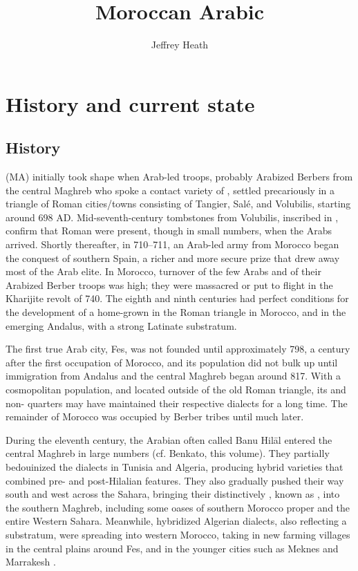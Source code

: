 \documentclass[output=paper]{langsci/langscibook}
\title{Moroccan Arabic}
\author{Jeffrey Heath\affiliation{University of Michigan}}
\begin{document}
\section{History and current state}

\subsection{History}

 (MA) initially took shape when Arab-led troops, probably Arabized Berbers from the central Maghreb who spoke a contact variety of , settled precariously in a triangle of Roman cities/towns consisting of Tangier, Salé, and Volubilis, starting around 698 AD. Mid-seventh-century tombstones from Volubilis, inscribed in , confirm that Roman  were present, though in small numbers, when the Arabs arrived. Shortly thereafter, in 710–711, an Arab-led army from Morocco began the conquest of southern Spain, a richer and more secure prize that drew away most of the Arab elite. In Morocco, turnover of the few Arabs and of their Arabized Berber troops was high; they were massacred or put to flight in the Kharijite revolt of 740. The eighth and ninth centuries had perfect conditions for the development of a home-grown  in the Roman triangle in Morocco, and in the emerging Andalus, with a strong Latinate substratum.  

The first true Arab city, Fes, was not founded until approximately 798, a century after the first occupation of Morocco, and its population did not bulk up until immigration from Andalus and the central Maghreb began around 817. With a cosmopolitan population, and located outside of the old Roman triangle, its  and non- quarters may have maintained their respective dialects for a long time. The remainder of Morocco was occupied by Berber tribes until much later.

During the eleventh century, the Arabian  often called Banu Hilāl entered the central Maghreb in large numbers (cf. Benkato, this volume). They partially bedouinized the  dialects in Tunisia and Algeria, producing hybrid varieties that combined pre- and post-Hilalian features. They also gradually pushed their way south and west across the Sahara, bringing their distinctively  , known as , into the southern Maghreb, including some oases of southern Morocco proper and the entire Western Sahara. Meanwhile, hybridized Algerian dialects, also reflecting a  substratum, were spreading into western Morocco, taking  in new farming villages in the central plains around Fes, and in the younger cities such as Meknes and Marrakesh \citep{Heath2002}.
\end{document}
